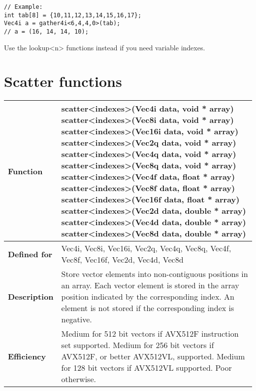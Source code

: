 \documentclass[vcl_manual.tex]{subfiles}
\begin{document}
\begin{lstlisting}[frame=none]
// Example:
int tab[8] = {10,11,12,13,14,15,16,17};
Vec4i a = gather4i<6,4,4,0>(tab);
// a = (16, 14, 14, 10);
\end{lstlisting}

Use the lookup\textless n\textgreater {} functions instead if you need variable indexes. \newline
{}


\section{Scatter functions}\label{Scatter functions}

\begin{tabular}{|p{30mm}|p{120mm}|} \hline
\bfseries Function & scatter\textless indexes\textgreater(Vec4i data, void * array) \newline
scatter\textless indexes\textgreater(Vec8i data, void * array) \newline
scatter\textless indexes\textgreater(Vec16i data, void * array) \newline
scatter\textless indexes\textgreater(Vec2q data, void * array) \newline
scatter\textless indexes\textgreater(Vec4q data, void * array) \newline
scatter\textless indexes\textgreater(Vec8q data, void * array) \newline
scatter\textless indexes\textgreater(Vec4f data, float * array) \newline
scatter\textless indexes\textgreater(Vec8f data, float * array) \newline
scatter\textless indexes\textgreater(Vec16f data, float * array) \newline
scatter\textless indexes\textgreater(Vec2d data, double * array) \newline
scatter\textless indexes\textgreater(Vec4d data, double * array) \newline
scatter\textless indexes\textgreater(Vec8d data, double * array) \\ \hline
\bfseries Defined for & 
Vec4i, Vec8i, Vec16i, Vec2q, Vec4q, Vec8q, \newline
Vec4f, Vec8f, Vec16f, Vec2d, Vec4d, Vec8d \\ \hline
\bfseries Description & Store vector elements into non-contiguous positions in an array. Each vector element is stored in the array position indicated by the corresponding index. An element is not stored if the corresponding index is negative. \\ \hline
\bfseries Efficiency & 
Medium for 512 bit vectors if AVX512F instruction set supported. \newline
Medium for 256 bit vectors if AVX512F, or better AVX512VL, supported. \newline
Medium for 128 bit vectors if AVX512VL supported. \newline
Poor otherwise. \\ \hline
\end{tabular}
\end{document}
